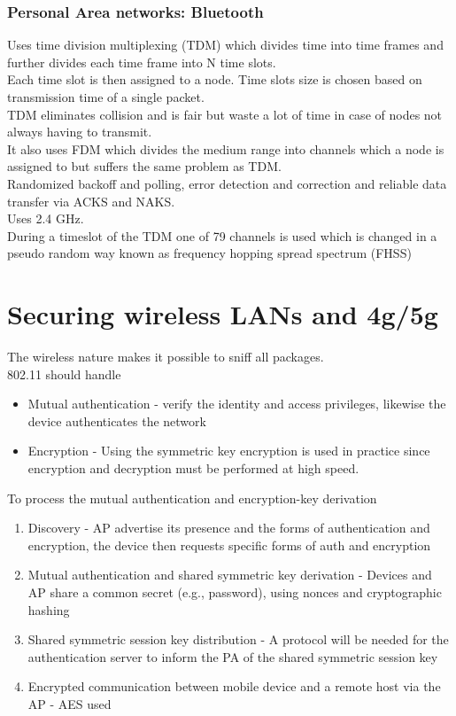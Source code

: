 \documentclass[12pt, a4paper]{article}
\begin{document}
		\subsubsection{Personal Area networks: Bluetooth}
			Uses time division multiplexing (TDM) which divides time into time frames and further divides each time frame into N time slots.\\
			Each time slot is then assigned to a node. Time slots size is chosen based on transmission time of a single packet.\\
			TDM eliminates collision and is fair but waste a lot of time in case of nodes not always having to transmit.\\
			It also uses FDM which divides the medium range into channels which a node is assigned to but suffers the same problem as TDM.\\
			Randomized backoff and polling, error detection and correction and reliable data transfer via ACKS and NAKS.\\
			Uses 2.4 GHz.\\
			During a timeslot of the TDM one of 79 channels is used which is changed in a pseudo random way known as frequency hopping spread spectrum (FHSS)\\
	\section{Securing wireless LANs and 4g/5g}
		The wireless nature makes it possible to sniff all packages.\\
		802.11 should handle
		\begin{itemize}
			\item Mutual authentication - verify the identity and access privileges, likewise the device authenticates the network
			\item Encryption - Using the symmetric key encryption is used in practice since encryption and decryption must be performed at high speed.
		\end{itemize}
		To process the mutual authentication and encryption-key derivation
		\begin{enumerate}
			\item Discovery - AP advertise its presence and the forms of authentication and encryption, the device then requests specific forms of auth and encryption
			\item Mutual authentication and shared symmetric key derivation - Devices and AP share a common secret (e.g., password), using nonces and cryptographic hashing
			\item Shared symmetric session key distribution - A protocol will be needed for the authentication server to inform the PA of the shared symmetric session key
			\item Encrypted communication between mobile device and a remote host via the AP - AES used
		\end{enumerate}
\end{document}
